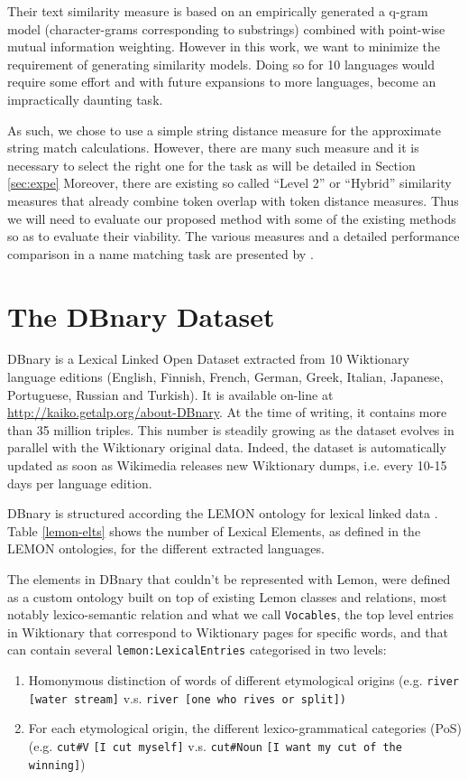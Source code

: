 \documentclass[10pt, a4paper]{article}
\begin{document}
  Their text similarity measure is based on an empirically generated a q-gram model (character-grams corresponding to substrings) combined with point-wise mutual information weighting. However in this work, we want to minimize the requirement of generating similarity models. Doing so for 10 languages would require some effort and with future expansions to more languages, become an impractically daunting task. 
 
 As such, we chose to use a simple string distance measure for the approximate string match calculations. However, there are many such measure and it is necessary to select the right one for the task as will be detailed in Section \ref{sec:expe} Moreover, there are existing so called ``Level 2'' or ``Hybrid'' similarity measures that already combine token overlap with token distance measures. Thus we will need to evaluate our proposed method with some of the existing methods so as to evaluate their viability. The various measures and a detailed performance comparison in a name matching task are presented by \cite{Cohen2003}.

\section{The DBnary Dataset}

DBnary is a Lexical Linked Open Dataset extracted from 10 Wiktionary language editions (English, Finnish, French, German, Greek, Italian, Japanese, Portuguese, Russian and Turkish). It is available on-line at \url{http://kaiko.getalp.org/about-DBnary}. At the time of writing, it contains more than 35 million triples. This number is steadily growing as the dataset evolves in parallel with the Wiktionary original data. Indeed, the dataset is automatically updated as soon as Wikimedia releases new Wiktionary dumps, i.e. every 10-15 days per language edition. 

DBnary is structured according the LEMON ontology for lexical linked data \cite{DBLP:conf/esws/McCraeSC11}. Table \ref{lemon-elts} shows the number of Lexical Elements, as defined in the LEMON ontologies, for the different extracted languages. 

The elements in DBnary that couldn't be represented with Lemon, were defined as a custom ontology built on top of existing Lemon classes and relations, most notably lexico-semantic relation and what we call \verb|Vocables|, the top level entries in Wiktionary that correspond to Wiktionary pages for specific words, and that can contain several \verb|lemon:LexicalEntries| categorised in two levels:
\begin{enumerate}
	\item Homonymous distinction of words of different etymological origins (e.g. \verb|river [water stream]| v.s. \verb|river [one who rives or split])|
	\item For each etymological origin, the different lexico-grammatical categories (PoS) (e.g. \verb|cut#V| \verb|[I cut myself]| v.s. \verb|cut#Noun| \verb|[I want my cut of the winning]|)
\end{enumerate}
\end{document}
